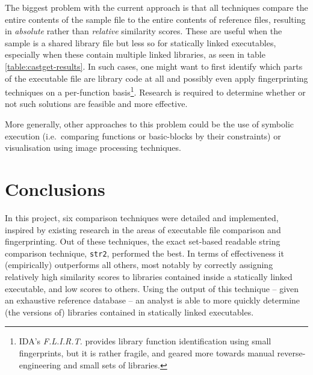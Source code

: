 \documentclass[twocolumn,a4paper]{IEEEtran} %
\begin{document}
The biggest problem with the current approach is that all techniques compare the entire contents of the sample file to the entire contents of reference files, resulting in \emph{absolute} rather than \emph{relative} similarity scores. These are useful when the sample is a shared library file but less so for statically linked executables, especially when these contain multiple linked libraries, as seen in table \ref{table:castget-results}. In such cases, one might want to first identify which parts of the executable file are library code at all and possibly even apply fingerprinting techniques on a per-function basis\footnote{IDA's \emph{F.L.I.R.T.}\cite{IDAFLIRT} provides library function identification using small fingerprints, but it is rather fragile, and geared more towards manual reverse-engineering and small sets of libraries.}. Research is required to determine whether or not such solutions are feasible and more effective.

More generally, other approaches to this problem could be the use of symbolic execution (i.e.~comparing functions or basic-blocks by their constraints) or visualisation \cite{conti2008visual} using image processing techniques.

\section{Conclusions}

In this project, six comparison techniques were detailed and implemented, inspired by existing research in the areas of executable file comparison and fingerprinting. Out of these techniques, the exact set-based readable string comparison technique, \texttt{str2}, performed the best. In terms of effectiveness it (empirically) outperforms all others, most notably by correctly assigning relatively high similarity scores to libraries contained inside a statically linked executable, and low scores to others. Using the output of this technique -- given an exhaustive reference database -- an analyst is able to more quickly determine (the versions of) libraries contained in statically linked executables.
\end{document}
